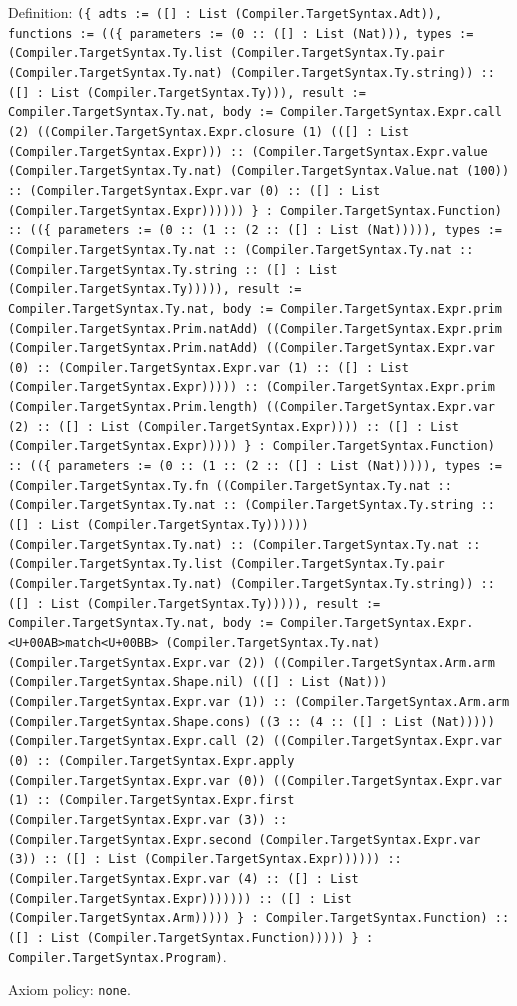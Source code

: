 \documentclass[11pt]{article}
\begin{document}
\noindent Definition: \texttt{(\{ adts := ([] : List (Compiler.TargetSyntax.Adt)), functions := ((\{ parameters := (0 :: ([] : List (Nat))), types := (Compiler.TargetSyntax.Ty.list (Compiler.TargetSyntax.Ty.pair (Compiler.TargetSyntax.Ty.nat) (Compiler.TargetSyntax.Ty.string)) :: ([] : List (Compiler.TargetSyntax.Ty))), result := Compiler.TargetSyntax.Ty.nat, body := Compiler.TargetSyntax.Expr.call (2) ((Compiler.TargetSyntax.Expr.closure (1) (([] : List (Compiler.TargetSyntax.Expr))) :: (Compiler.TargetSyntax.Expr.value (Compiler.TargetSyntax.Ty.nat) (Compiler.TargetSyntax.Value.nat (100)) :: (Compiler.TargetSyntax.Expr.var (0) :: ([] : List (Compiler.TargetSyntax.Expr)))))) \} : Compiler.TargetSyntax.Function) :: ((\{ parameters := (0 :: (1 :: (2 :: ([] : List (Nat))))), types := (Compiler.TargetSyntax.Ty.nat :: (Compiler.TargetSyntax.Ty.nat :: (Compiler.TargetSyntax.Ty.string :: ([] : List (Compiler.TargetSyntax.Ty))))), result := Compiler.TargetSyntax.Ty.nat, body := Compiler.TargetSyntax.Expr.prim (Compiler.TargetSyntax.Prim.natAdd) ((Compiler.TargetSyntax.Expr.prim (Compiler.TargetSyntax.Prim.natAdd) ((Compiler.TargetSyntax.Expr.var (0) :: (Compiler.TargetSyntax.Expr.var (1) :: ([] : List (Compiler.TargetSyntax.Expr))))) :: (Compiler.TargetSyntax.Expr.prim (Compiler.TargetSyntax.Prim.length) ((Compiler.TargetSyntax.Expr.var (2) :: ([] : List (Compiler.TargetSyntax.Expr)))) :: ([] : List (Compiler.TargetSyntax.Expr))))) \} : Compiler.TargetSyntax.Function) :: ((\{ parameters := (0 :: (1 :: (2 :: ([] : List (Nat))))), types := (Compiler.TargetSyntax.Ty.fn ((Compiler.TargetSyntax.Ty.nat :: (Compiler.TargetSyntax.Ty.nat :: (Compiler.TargetSyntax.Ty.string :: ([] : List (Compiler.TargetSyntax.Ty)))))) (Compiler.TargetSyntax.Ty.nat) :: (Compiler.TargetSyntax.Ty.nat :: (Compiler.TargetSyntax.Ty.list (Compiler.TargetSyntax.Ty.pair (Compiler.TargetSyntax.Ty.nat) (Compiler.TargetSyntax.Ty.string)) :: ([] : List (Compiler.TargetSyntax.Ty))))), result := Compiler.TargetSyntax.Ty.nat, body := Compiler.TargetSyntax.Expr.<U+00AB>match<U+00BB> (Compiler.TargetSyntax.Ty.nat) (Compiler.TargetSyntax.Expr.var (2)) ((Compiler.TargetSyntax.Arm.arm (Compiler.TargetSyntax.Shape.nil) (([] : List (Nat))) (Compiler.TargetSyntax.Expr.var (1)) :: (Compiler.TargetSyntax.Arm.arm (Compiler.TargetSyntax.Shape.cons) ((3 :: (4 :: ([] : List (Nat))))) (Compiler.TargetSyntax.Expr.call (2) ((Compiler.TargetSyntax.Expr.var (0) :: (Compiler.TargetSyntax.Expr.apply (Compiler.TargetSyntax.Expr.var (0)) ((Compiler.TargetSyntax.Expr.var (1) :: (Compiler.TargetSyntax.Expr.first (Compiler.TargetSyntax.Expr.var (3)) :: (Compiler.TargetSyntax.Expr.second (Compiler.TargetSyntax.Expr.var (3)) :: ([] : List (Compiler.TargetSyntax.Expr)))))) :: (Compiler.TargetSyntax.Expr.var (4) :: ([] : List (Compiler.TargetSyntax.Expr))))))) :: ([] : List (Compiler.TargetSyntax.Arm))))) \} : Compiler.TargetSyntax.Function) :: ([] : List (Compiler.TargetSyntax.Function))))) \} : Compiler.TargetSyntax.Program)}.\par
\noindent Axiom policy: \texttt{none}.\par
\end{document}
